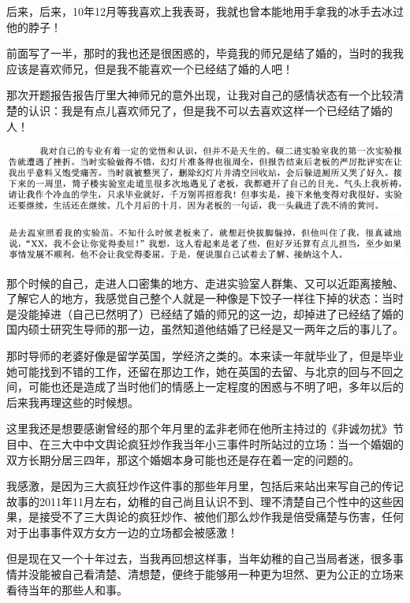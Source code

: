 \documentclass[9pt, b5paper]{article}
\begin{document}
后来，后来，10年12月等我喜欢上我表哥，我就也曾本能地用手拿我的冰手去冰过他的脖子！

前面写了一半，那时的我也还是很困惑的，毕竟我的师兄是结了婚的，当时的我我应该是喜欢师兄，但是我不能喜欢一个已经结了婚的人吧！

那次开题报告报告厅里大神师兄的意外出现，让我对自己的感情状态有一个比较清楚的认识：我是有点儿喜欢师兄了，但是我不可以去喜欢这样一个已经结了婚的人！

\begin{center}
\includegraphics[width=.9\linewidth]{./pic/backups_plans_20210503_130145.png}
\end{center}

\begin{center}
\includegraphics[width=.9\linewidth]{./pic/backups_plans_20210503_130253.png}
\end{center}

那个时候的自己，走进人口密集的地方、走进实验室人群集、又可以近距离接触、了解它人的地方，我感觉自己整个人就是一种像是下饺子一样往下掉的状态：当时是没能掉进（自己已然明了）已经结了婚的师兄的这一边，却掉进了已经结了婚的国内硕士研究生导师的那一边，虽然知道他结婚了已经是又一两年之后的事儿了。 

那时导师的老婆好像是留学英国，学经济之类的。本来读一年就毕业了，但是毕业她可能找到不错的工作，还留在那边工作，她在英国的去留、与北京的回与不回之间，可能也还是造成了当时他们的情感上一定程度的困惑与不明了吧，多年以后的后来我再理这些的时候想。 

这里我还是想要感谢曾经的那个年月里的孟非老师在他所主持过的《非诚勿扰》节目中、在三大中中文舆论疯狂炒作我当年小三事件时所站过的立场：当一个婚姻的双方长期分居三四年，那这个婚姻本身可能也还是存在着一定的问题的。

我感激，是因为三大疯狂炒作这件事的那些年月里，包括后来站出来写自己的传记故事的2011年11月左右，幼稚的自己尚且认识不到、理不清楚自己个性中的这些因果，是接受不了三大舆论的疯狂炒作、被他们那么炒作我是倍受痛楚与伤害，任何对于出事事件双方女方一边的立场都会被感激！

但是现在又一个十年过去，当我再回想这样事，当年幼稚的自己当局者迷，很多事情并没能被自己看清楚、清想楚，便终于能够用一种更为坦然、更为公正的立场来看待当年的那些人和事。 
\end{document}
